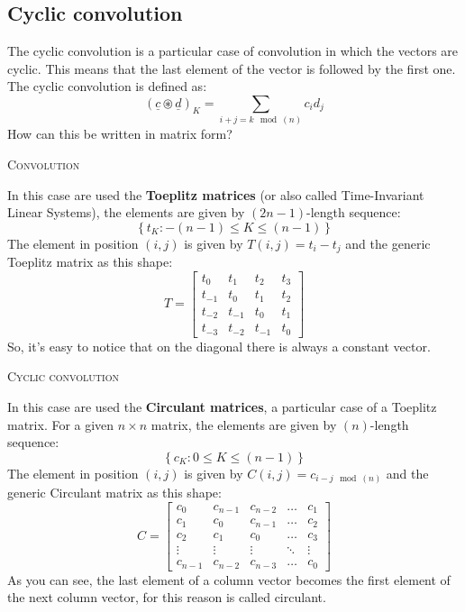 \subsection*{Cyclic convolution}
The cyclic convolution is a particular case of convolution in which the vectors are cyclic. This means that the last element of the vector is followed by the first one. The cyclic convolution is defined as:
\[
    (\underline{c}\circledast \underline{d})_K = \sum_{i+j = k \mod(n)} c_i d_j 
\]
How can this be written in matrix form?
\begin{multicols}{2}
    \begin{center}
        \textsc{Convolution}
    \end{center}
    In this case are used the \textbf{Toeplitz matrices} (or also called Time-Invariant Linear Systems), the elements are given by $(2n - 1)$-length sequence:
    \[
        \left\{t_K: -(n-1) \leq K \leq (n-1) \right\}    
    \]
    The element in position $(i,j)$ is given by $T(i,j) = t_i - t_j$ and the generic Toeplitz matrix as this shape:
\[
T = \begin{bmatrix}
    t_0 & t_1 & t_2 & t_3 \\
    t_{-1} & t_0 & t_1 & t_2 \\
    t_{-2} & t_{-1} & t_0 & t_1 \\
    t_{-3} & t_{-2} & t_{-1} & t_0
\end{bmatrix}
\]
    So, it's easy to notice that on the diagonal there is always a constant vector.
    \newcolumn
    \begin{center}
        \textsc{Cyclic convolution}
    \end{center}
    In this case are used the \textbf{Circulant matrices}, a particular case of a Toeplitz matrix. For a given $n \times n$ matrix, the elements are given by $(n)$-length sequence:
    \[
        \left\{c_K: 0 \leq K \leq (n-1) \right\}
    \]
    The element in position $(i,j)$ is given by $C(i,j) = c_{i-j \mod(n)}$ and the generic Circulant matrix as this shape:
    \[
        C = \begin{bmatrix}
            c_0 & c_{n-1} & c_{n-2} & \dots & c_1 \\
            c_1 & c_0 & c_{n-1} & \dots & c_2 \\
            c_2 & c_1 & c_0 & \dots & c_3 \\
            \vdots & \vdots & \vdots & \ddots & \vdots \\
            c_{n-1} & c_{n-2} & c_{n-3} & \dots & c_0
        \end{bmatrix}
    \]
    As you can see, the last element of a column vector becomes the first element of the next column vector, for this reason is called circulant. 
\end{multicols}
